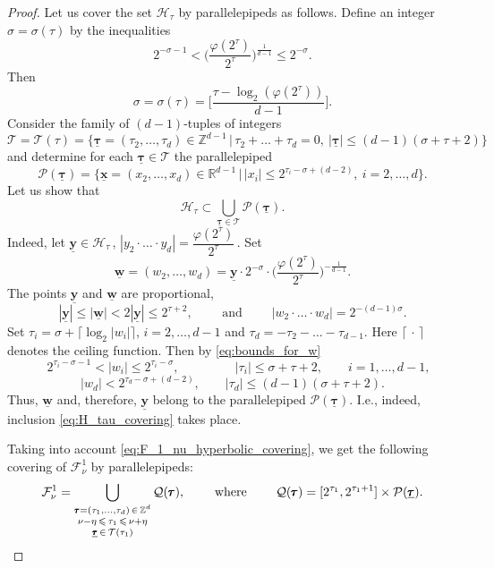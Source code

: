 \documentclass[a4paper,12pt]{article}
\theoremstyle{definition}
\theoremstyle{remark}
\theoremstyle{plain}
\renewcommand{\vec}[1]{\mathbf{#1}}
\renewcommand{\leq}{\leqslant}
\newcommand{\R}{\mathbb{R}}
\newcommand{\Z}{\mathbb{Z}}
\newcommand{\cF}{\mathcal{F}}
\newcommand{\cH}{\mathcal{H}}
\newcommand{\cP}{\mathcal{P}}
\newcommand{\cQ}{\mathcal{Q}}
\newcommand{\cT}{\mathcal{T}}
\begin{document}
\begin{proof}
  Let us cover the set $\cH_\tau$ by parallelepipeds as follows. Define an integer $\sigma=\sigma(\tau)$ by the inequalities
  \[
    2^{-\sigma-1}<
    \bigg(\dfrac{\varphi(2^\tau)}{2^\tau}\bigg)^{\frac1{d-1}}\leq
    2^{-\sigma}.
  \]
  Then
  \begin{equation}\label{eq:sigma_of_tau}
    \sigma=\sigma(\tau)=\bigg[\frac{\tau-\log_2(\varphi(2^\tau))}{d-1}\bigg].
  \end{equation}
  Consider the family of $(d-1)$-tuples of integers
  \[
    \cT=\cT(\tau)=\Big\{\underline{\pmb\tau}=(\tau_2,\ldots,\tau_d)\in\Z^{d-1} \,\Big|\, \tau_2+\ldots+\tau_d=0,\ |\underline{\pmb\tau}|\leq(d-1)(\sigma+\tau+2) \Big\}
  \]  
  and determine for each $\underline{\pmb\tau}\in\cT$ the parallelepiped
  \[
    \cP(\underline{\pmb\tau})=
    \Big\{\underline{\vec x}=(x_2,\ldots,x_d)\in\R^{d-1} \,\Big|\, |x_i|\leq2^{\tau_i-\sigma+(d-2)},\ i=2,\ldots,d \Big\}.
  \]
  Let us show that
  \begin{equation}\label{eq:H_tau_covering}
    \cH_\tau\subset\bigcup_{\underline{\pmb\tau}\in\cT}\cP(\underline{\pmb\tau}).
  \end{equation}
  Indeed, let $\underline{\vec y}\in\cH_\tau$\,, $|y_2\cdot\ldots\cdot y_d|=\dfrac{\varphi(2^\tau)}{2^\tau}$\,. Set
  \[
    \underline{\vec w}=(w_2,\ldots,w_d)=
    \underline{\vec y}\cdot2^{-\sigma}\cdot\bigg(\dfrac{\varphi(2^\tau)}{2^\tau}\bigg)^{-\frac1{d-1}}.
  \]
  The points $\underline{\vec y}$ and $\underline{\vec w}$ are proportional,
  \begin{equation}\label{eq:bounds_for_w}
    |\underline{\vec y}|\leq|\underline{\vec w}|<2|\underline{\vec y}|\leq2^{\tau+2},
    \qquad\text{ and }\qquad
    |w_2\cdot\ldots\cdot w_d|=2^{-(d-1)\sigma}.
  \end{equation}
  Set $\tau_i=\sigma+\big\lceil\log_2|w_i|\big\rceil$, $i=2,\ldots,d-1$ and $\tau_d=-\tau_2-\ldots-\tau_{d-1}$. Here $\lceil\,\cdot\,\rceil$ denotes the ceiling function. Then by \eqref{eq:bounds_for_w}
  \[
    \quad
    2^{\tau_i-\sigma-1}<|w_i|\leq2^{\tau_i-\sigma},
    \qquad\qquad\ \
    |\tau_i|\leq\sigma+\tau+2,
    \qquad
    i=1,\ldots,d-1,
  \]
  \[
    |w_d|<
    2^{\tau_d-\sigma+(d-2)},
    \qquad
    |\tau_d|\leq(d-1)(\sigma+\tau+2).
  \]
  Thus, $\underline{\vec w}$ and, therefore, $\underline{\vec y}$ belong to the parallelepiped $\cP(\underline{\pmb\tau})$. I.e., indeed, inclusion \eqref{eq:H_tau_covering} takes place.
  
  Taking into account \eqref{eq:F_1_nu_hyperbolic_covering}, we get the following covering of $\cF^1_\nu$ by parallelepipeds:
  \[
    \cF^1_\nu=
    \bigcup_{\substack{\pmb\tau=(\tau_1,\ldots,\tau_d)\,\in\,\Z^d \\ 
             \nu-\eta\,\leq\,\tau_1\,\leq\,\nu+\eta \vphantom{\frac11} \\ 
             \underline{\pmb\tau}\,\in\,\cT(\tau_1)}}
    \cQ(\pmb\tau),
    \qquad\text{ where }\qquad
    \cQ(\pmb\tau)=
    [2^{\tau_1},2^{\tau_1+1}]\times\cP(\underline{\pmb\tau}).
  \]
  

\end{proof}
\end{document}
